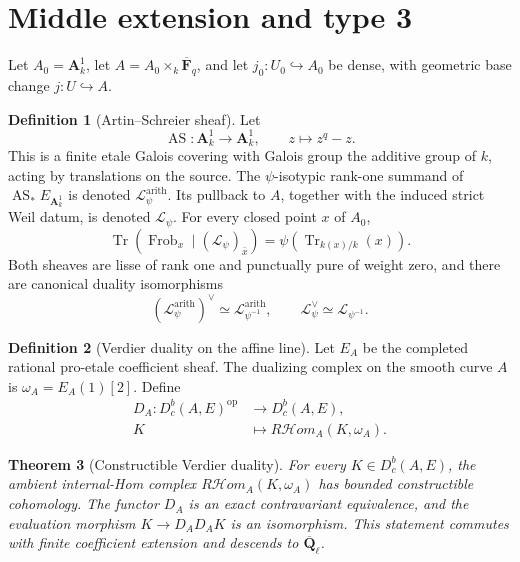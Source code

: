 \documentclass[10pt]{article}
\newtheorem{theorem}{Theorem}[section]
\theoremstyle{definition}
\newtheorem{definition}[theorem]{Definition}
\newcommand{\Fbar}{\overline{\mathbf F}_q}
\newcommand{\Qlb}{\overline{\mathbf Q}_\ell}
\newcommand{\Aone}{\mathbf A^1}
\newcommand{\Dbc}{D^b_c}
\newcommand{\Frob}{\operatorname{Frob}}
\begin{document}
\section{Middle extension and type 3}

Let \(A_0=\Aone_k\), let \(A=A_0\times_k\Fbar\), and let
\(j_0:U_0\hookrightarrow A_0\) be dense, with geometric base change
\(j:U\hookrightarrow A\).

\begin{definition}[Artin--Schreier sheaf]
Let
\[
             \operatorname{AS}:\Aone_k\longrightarrow\Aone_k,
             \qquad z\longmapsto z^q-z .
\]
This is a finite etale Galois covering with Galois group the additive
group of \(k\), acting by translations on the source.  The
\(\psi\)-isotypic rank-one summand of
\(\operatorname{AS}_*E_{\Aone_k}\) is denoted
\(\mathcal L_\psi^{\mathrm{arith}}\).  Its pullback to \(A\), together
with the induced strict Weil datum, is denoted \(\mathcal L_\psi\).  For
every closed point \(x\) of \(A_0\),
\[
 \operatorname{Tr}\!\left(
   \Frob_x\mid(\mathcal L_\psi)_{\bar x}\right)
   =\psi\!\left(\operatorname{Tr}_{k(x)/k}(x)\right).
\]
Both sheaves are lisse of rank one and punctually pure of weight zero, and
there are canonical duality isomorphisms
\[
 (\mathcal L_\psi^{\mathrm{arith}})^\vee
     \simeq\mathcal L_{\psi^{-1}}^{\mathrm{arith}},
 \qquad
 \mathcal L_\psi^\vee\simeq\mathcal L_{\psi^{-1}}.
\]
\end{definition}

\begin{definition}[Verdier duality on the affine line]
Let \(E_A\) be the completed rational pro-etale coefficient sheaf.  The
dualizing complex on the smooth curve \(A\) is
\(\omega_A=E_A(1)[2]\).  Define
\[
 \begin{aligned}
 D_A:\Dbc(A,E)^{\mathrm{op}}&\longrightarrow\Dbc(A,E),\\
 K&\longmapsto R\mathcal Hom_A(K,\omega_A).
 \end{aligned}
\]
\end{definition}

\begin{theorem}[Constructible Verdier duality]
For every \(K\in\Dbc(A,E)\), the ambient internal-Hom complex
\(R\mathcal Hom_A(K,\omega_A)\) has bounded constructible cohomology.
The functor \(D_A\) is an exact contravariant equivalence, and the
evaluation morphism \(K\to D_AD_AK\) is an isomorphism.  This statement
commutes with finite coefficient extension and descends to \(\Qlb\).
\end{theorem}
\end{document}
